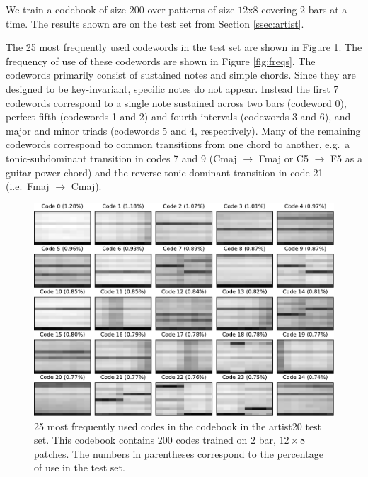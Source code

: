 \documentclass{article}
\newcommand{\ie}{i.e.~}
\newcommand{\eg}{e.g.~}
\begin{document}
We train a codebook of size $200$ over patterns of size $12$x$8$ covering
$2$ bars at a time.  The results shown are on the test set from
Section \ref{ssec:artist}.


The 25 most frequently used codewords in the test set are shown in
Figure \ref{fig:codes1}.  
The frequency of use of these codewords are shown in Figure \ref{fig:freqs}.
The codewords primarily consist of sustained
notes and simple chords.  Since they are designed to be key-invariant,
specific notes do not appear.  Instead the first 7 codewords
correspond to a single note sustained across two bars (codeword 0),
perfect fifth (codewords 1 and 2) and fourth intervals (codewords 3
and 6), and 
major and minor triads (codewords 5 and 4, respectively).  Many of the remaining
codewords correspond to common transitions from one chord to another,
\eg a tonic-subdominant transition in codes 7 and 9
(Cmaj
$\rightarrow$ Fmaj or C5 $\rightarrow$ F5 as a guitar power chord)
and the reverse tonic-dominant transition in code 21 (\ie Fmaj
$\rightarrow$ Cmaj).

\begin{figure}[h]
\begin{center}
\includegraphics[width=.9\columnwidth]{codes1}
\end{center}
\caption{\small{
25 most frequently used codes in the codebook %
in the artist20 test set. 
This codebook contains $200$ codes trained on $2$ bar, $12 \times 8$
patches.
The numbers 
in parentheses correspond to 
the percentage of use in the test set.
}}
\label{fig:codes1}
\end{figure}
\end{document}
